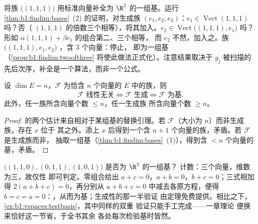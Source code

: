 \begin{example}[运行补全算法]
\label{ex:b1:findim:completion}
将族 $\bigl((1,1,1)\bigr)$ 用标准向量补全为
$\R^3$ 的一组基。运行
\cref{thm:b1:findim:bases}~(2) 的证明，对生成族 $(e_1,
e_2, e_3)$：$e_1 \in \operatorname{Vect}(1,1,1)$ 吗？否（
$(1,1,1)$ 的倍数三个相等），将其加入。$e_2 \in
\operatorname{Vect}\bigl((1,1,1), e_1\bigr)$ 吗？形如
$\alpha(1,1,1) + \beta e_1$ 的组合第二、三个相等，
而 $e_2$ 不然，加入之。族
$\bigl((1,1,1), e_1, e_2\bigr)$ ，含 $3$ 个向量：停止，
即为一组基（\cref{prop:b1:findim:twoofthree}
将使此做法正式化）。注意结果取决于
$g_j$ 被扫描的先后次序，补全是一个算法，而非一个公式。
\end{example}

\begin{proposition}[三取二规则]\label{prop:b1:findim:twoofthree}
设 $\dim E = n$，$\mathcal{F}$ 为恰含 $n$ 个向量的
$E$ 中的族，则
\[
\mathcal{F} \text{ 线性无关} \iff \mathcal{F} \text{ 生成} \iff
\mathcal{F} \text{ 为基}.
\]
此外，任一族所含向量个数 $\leq n$，任一生成族
所含向量个数 $\geq n$。
\end{proposition}

\begin{proof}
的两个估计来自相对于某组基的替换引理。若
$\mathcal{F}$（大小为 $n$）而非生成族，存在 $x$ 位于
其之外。添上 $x$ 后得到一个含 $n + 1$
个向量的族，矛盾。若 $\mathcal{F}$ 是生成族而非，
抽取一组基（\cref{thm:b1:findim:bases}~(1)），得到含
$< n$ 个向量的基，矛盾。
\end{proof}

\begin{example}
\label{ex:b1:findim:twoofthreerun}
$\bigl((1,1,0), (0,1,1), (1,0,1)\bigr)$ 是否为 $\R^3$ 的一组基？
计数：三个向量，维数为三，故仅性
即可判定。零组合给出 $a + c = 0$，$a + b = 0$，$b +
c = 0$；三式相加得 $2(a + b + c) = 0$，再分别从
$a + b + c = 0$ 中减去各原方程，便得 $b = c = a =
0$：，从而为基；生成性的那一半验证
由定理免费提供。相比之下，
\cref{ex:b1:vspaces:testbasis}，其中同样的双重
验证只能手工完成——一章理论
便换来恰好这一节省，于全书其余
各处每次检验基时皆然。
\end{example}

